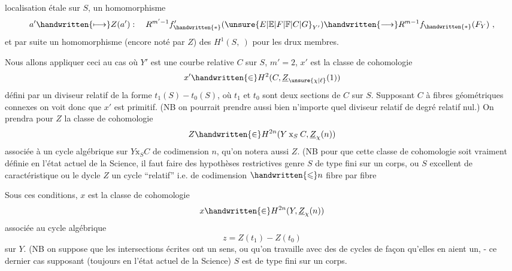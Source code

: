 localisation étale sur $S$, un homomorphisme
\[
a'\handwritten{\longmapsto}Z(a'):\quad R^{m'-1}f'_{\handwritten{*}}({\unsure{E|\mathbb{E}|F|\mathbb{F}|C|G}}_{Y'})\handwritten{\longrightarrow}R^{m-1}f_{\handwritten{*}}(F_Y)\ ,
\]
et par suite un homomorphisme (encore noté par $Z$) des $H^1(S,\ )$ pour les drux membres.

Nous allons appliquer ceci au cas où $Y'$ est une courbe relative $C$ sur $S$, $m'=2$, $x'$ est la classe de cohomologie
\[
x'\handwritten{\in}H^2(C,\underline{Z}_{\unsure{\chi|\ell}}(1))
\]
défini par un diviseur relatif de la forme $t_1(S)-t_0(S)$, où $t_1$ et $t_0$ sont deux sections de $C$ sur $S$. Supposant $C$ à fibres géométriques connexes on voit donc que $x'$ est primitif. (NB on pourrait prendre aussi bien n'importe quel diviseur relatif de degré relatif nul.) On prendra pour $Z$ la classe de cohomologie
\[
Z\handwritten{\in}H^{2n}(Y\mathbin{\mathrm{x}}_S C,\underline{Z}_{\chi}(n))
\]
associée à un cycle algébrique sur $Y\mathbin{\mathrm{x}}_S C$ de codimension $n$, qu'on notera aussi $Z$. (NB pour que cette classe de cohomologie soit vraiment définie en l'état actuel de la Science, il faut faire des hypothèses restrictives genre $S$ de type fini sur un corps, ou $S$ excellent de caractéristique  ou le dycle $Z$ un cycle ``relatif'' i.e. de codimension $\handwritten{\leqslant}n$ fibre par fibre

Sous ces conditions, $x$ est la classe de cohomologie
\[
x\handwritten{\in}H^{2n}(Y,\underline{Z}_{\chi}(n))
\]
associée au cycle algébrique
\[
z=Z(t_1)-Z(t_0)
\]
sur $Y$. (NB on suppose que les intersections écrites ont un sens, ou qu'on travaille avec des  de cycles de façon qu'elles en aient un, - ce dernier cas supposant (toujours en l'état actuel de la Science)  $S$ est de type fini sur un corps.
